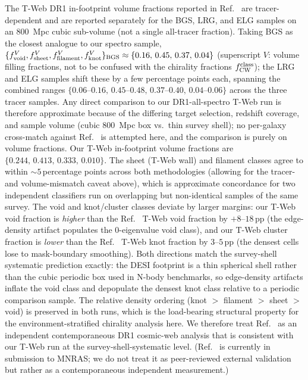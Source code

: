 \documentclass[aps,prd,twocolumn,superscriptaddress,showpacs,preprintnumbers,nofootinbib,longbibliography,floatfix]{revtex4-2}
\begin{document}
The T-Web DR1 in-footprint volume fractions reported in
Ref.~\cite{TWebDESI2026} are tracer-dependent and are reported
separately for the BGS, LRG, and ELG samples on an $800$~Mpc cubic
sub-volume (not a single all-tracer fraction). Taking BGS as the
closest analogue to our spectro sample,
$\{f^{V}_{\rm void}, f^{V}_{\rm sheet}, f^{V}_{\rm filament}, f^{V}_{\rm knot}\}_{\rm BGS}
\approx \{0.16,\, 0.45,\, 0.37,\, 0.04\}$ (superscript $V$: volume
filling fractions, not to be confused with the chirality fractions
$f_{\rm CW}^{\rm class}$);
the LRG and ELG samples shift these by a few percentage points each,
spanning the combined ranges
$\{0.06\text{--}0.16,\, 0.45\text{--}0.48,\, 0.37\text{--}0.40,\,
0.04\text{--}0.06\}$
across the three tracer samples. Any direct
comparison to our DR1-all-spectro T-Web run is therefore approximate
because of the differing target selection, redshift coverage, and
sample volume (cubic $800$~Mpc box vs.\ thin survey shell); no
per-galaxy cross-match against Ref.~\cite{TWebDESI2026} is attempted
here, and the comparison is purely on volume fractions. Our T-Web
in-footprint volume fractions
are $\{0.244,\, 0.413,\, 0.333,\, 0.010\}$. The sheet (T-Web wall) and
filament classes agree to within ${\sim}5$\,percentage points across
both methodologies (allowing for the tracer- and volume-mismatch
caveat above), which is approximate concordance for two independent
classifiers run on overlapping but non-identical samples of the same
survey. The void and knot/cluster classes
deviate by larger margins: our T-Web void fraction is \emph{higher} than
the Ref.~\cite{TWebDESI2026} T-Web void fraction by $+8$--$18$\,pp (the edge-density artifact populates the
0-eigenvalue void class), and our T-Web cluster fraction is
\emph{lower} than the Ref.~\cite{TWebDESI2026} T-Web knot fraction by $3$--$5$\,pp (the densest
cells lose to mask-boundary smoothing). Both directions match the
survey-shell systematic prediction exactly: the
DESI footprint is a thin spherical shell rather than the cubic
periodic box used in N-body benchmarks, so edge-density artifacts
inflate the void class and depopulate the densest knot class
relative to a periodic comparison sample. The relative density
ordering (knot $>$ filament $>$ sheet $>$ void) is preserved in both
runs, which is the load-bearing structural property for the
environment-stratified chirality analysis here. We therefore treat
Ref.~\cite{TWebDESI2026} as an independent contemporaneous DR1
cosmic-web analysis that is consistent with our T-Web run at the
survey-shell-systematic level. (Ref.~\cite{TWebDESI2026} is currently
in submission to MNRAS; we do not treat it as peer-reviewed external
validation but rather as a contemporaneous independent measurement.)
\end{document}
